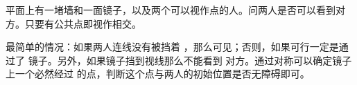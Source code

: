 \begin{prob}
	平面上有一堵墙和一面镜子，以及两个可以视作点的人。问两人是否可以看到对方。只要有公共点即视作相交。
\end{prob}

\begin{sol}
	最简单的情况：如果两人连线没有被挡着
	，那么可见；否则，如果可行一定是通过了
	镜子。另外，如果镜子挡到视线那么不能看到
	对方。通过对称可以确定镜子上一个必然经过
	的点，判断这个点与两人的初始位置是否无障碍即可。
\end{sol}
